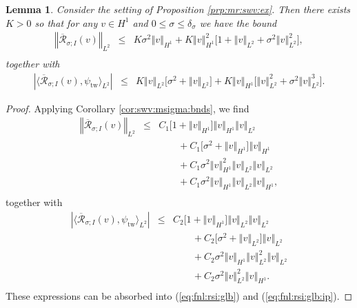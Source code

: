 \documentclass[10pt]{articleHJ}
\newcommand{\abs}[1]{\left\vert#1\right\vert}			%
\newcommand{\norm}[1]{\left\Vert#1\right\Vert}		%
\newcommand{\sref}[1]{(\ref{#1})}                       %
\newtheorem{lem}[thm]{Lemma}
\numberwithin{equation}{section}
\begin{document}
\begin{lem}
\label{lem:fnl:rsi}
Consider the setting
of Proposition \ref{prp:mr:swv:ex}.
Then there exists $K > 0$
so that for any $v \in H^1$
and $0 \le \sigma \le \delta_{\sigma}$
we have the bound
\begin{equation}
\label{eq:fnl:rsi:glb}
\begin{array}{lcl}
\norm{\overline{\mathcal{R}}_{\sigma;I}(v)}_{L^2}
& \le &
K \sigma^2 \norm{v}_{H^1}
+ K \norm{v}_{H^1}^2
  \big[
    1 + \norm{v}_{L^2} + \sigma^2 \norm{v}_{L^2}^2
  \big] ,
\\[0.2cm]
\end{array}
\end{equation}
together with
\begin{equation}
\label{eq:fnl:rsi:glb:ip}
\begin{array}{lcl}
\abs{ \langle \overline{\mathcal{R}}_{\sigma;I}(v)  , \psi_{\mathrm{tw}} \rangle_{L^2} }
& \le &
K  \norm{v}_{L^2}
  \big[ \sigma^2 + \norm{v}_{L^2} \big]
+ K \norm{v}_{H^1}
  \big[
     \norm{v}_{L^2}^2 + \sigma^2 \norm{v}_{L^2}^3
  \big]    .
\end{array}
\end{equation}
\end{lem}
\begin{proof}
Applying Corollary
\ref{cor:swv:msigma:bnds},
we find
\begin{equation}
\begin{array}{lcl}
\norm{\overline{\mathcal{R}}_{\sigma;I}(v)}_{L^2}
& \le &
C_1 \big[ 1 + \norm{v}_{H^1}  \big]
    \norm{v}_{H^1}
     \norm{v}_{L^2}
\\[0.2cm]
& & \qquad
+ C_1 \big[
  \sigma^2 + \norm{v}_{H^1}
  \big] \norm{v}_{H^1}
\\[0.2cm]
& & \qquad
+ C_1 \sigma^2
    \norm{v}_{H^1}^2 \norm{v}_{L^2}
 \norm{v}_{L^2}
\\[0.2cm]
& & \qquad
  + C_1 \sigma^2
   \norm{v}_{H^1} \norm{v}_{L^2}
     \norm{v}_{H^1} ,
\\[0.2cm]
\end{array}
\end{equation}
together with
\begin{equation}
\begin{array}{lcl}
\abs{ \langle \overline{\mathcal{R}}_{\sigma;I}(v)  , \psi_{\mathrm{tw}} \rangle_{L^2} }
& \le &
C_2 \big[ 1 + \norm{v}_{H^1}  \big]
     \norm{v}_{L^2}
     \norm{v}_{L^2}
\\[0.2cm]
& & \qquad
+ C_2 \big[
  \sigma^2 +
  \norm{v}_{L^2}
    \big]
     \norm{v}_{L^2}
\\[0.2cm]
& & \qquad
+ C_2 \sigma^2
    \norm{v}_{H^1} \norm{v}_{L^2}^2
    \norm{v}_{L^2}
\\[0.2cm]
& & \qquad
  + C_2 \sigma^2
    \norm{v}_{L^2}^2
    \norm{v}_{H^1}.
\\[0.2cm]
\end{array}
\end{equation}
These expressions can be absorbed into
\sref{eq:fnl:rsi:glb} and \sref{eq:fnl:rsi:glb:ip}.
\end{proof}
\end{document}
